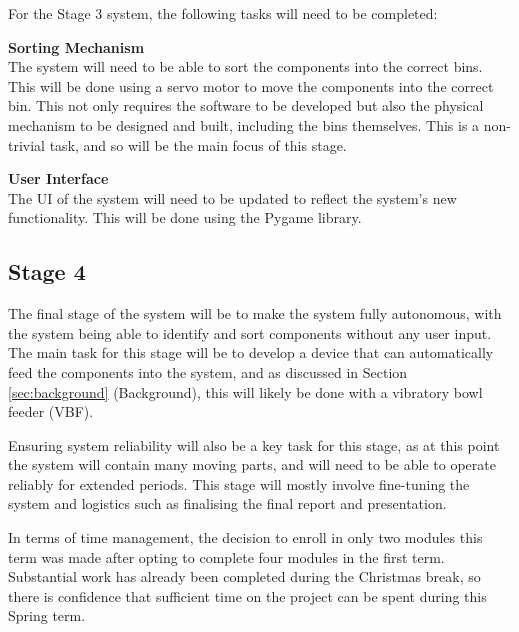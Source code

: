 For the Stage 3 system, the following tasks will need to be completed:
\begin{mylist}
    \item \textbf{Sorting Mechanism} \\
    The system will need to be able to sort the components into the correct bins. This will be done using a servo motor to move the components into the correct bin.
    This not only requires the software to be developed but also the physical mechanism to be designed and built, including the bins themselves.
    This is a non-trivial task, and so will be the main focus of this stage.
    \item \textbf{User Interface} \\
    The UI of the system will need to be updated to reflect the system's new functionality. This will be done using the Pygame library\cite{pygamedoc}.
\end{mylist}

\subsection{Stage 4}
The final stage of the system will be to make the system fully autonomous, with the system being able to identify and sort components without any user input.
The main task for this stage will be to develop a device that can automatically feed the components into the system, and as 
discussed in Section \ref{sec:background} (Background), this will likely be done with a vibratory bowl feeder (VBF).

Ensuring system reliability will also be a key task for this stage, as at this point the system will contain many moving parts, and will need to be able to
operate reliably for extended periods. This stage will mostly involve fine-tuning the system and logistics such as
finalising the final report and presentation.

\noindent
In terms of time management, the decision to enroll in only two modules this term was made after opting to complete four modules in the first term. Substantial work has already been completed
during the Christmas break, so there is confidence that sufficient time on the project can be spent during this Spring term.

